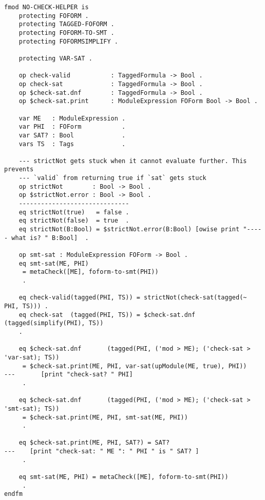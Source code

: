 \documentclass[]{article}
\begin{document}
\begin{verbatim}
fmod NO-CHECK-HELPER is
    protecting FOFORM .
    protecting TAGGED-FOFORM .
    protecting FOFORM-TO-SMT .
    protecting FOFORMSIMPLIFY .

    protecting VAR-SAT .

    op check-valid           : TaggedFormula -> Bool .
    op check-sat             : TaggedFormula -> Bool .
    op $check-sat.dnf        : TaggedFormula -> Bool .
    op $check-sat.print      : ModuleExpression FOForm Bool -> Bool .

    var ME   : ModuleExpression .
    var PHI  : FOForm           .
    var SAT? : Bool             .
    vars TS  : Tags             .

    --- strictNot gets stuck when it cannot evaluate further. This prevents
    --- `valid` from returning true if `sat` gets stuck
    op strictNot        : Bool -> Bool .
    op $strictNot.error : Bool -> Bool .
    ------------------------------
    eq strictNot(true)   = false .
    eq strictNot(false)  = true  .
    eq strictNot(B:Bool) = $strictNot.error(B:Bool) [owise print "----- what is? " B:Bool]  .

    op smt-sat : ModuleExpression FOForm -> Bool .
    eq smt-sat(ME, PHI)
     = metaCheck([ME], foform-to-smt(PHI))
     .

    eq check-valid(tagged(PHI, TS)) = strictNot(check-sat(tagged(~ PHI, TS))) .
    eq check-sat  (tagged(PHI, TS)) = $check-sat.dnf       (tagged(simplify(PHI), TS))
    .

    eq $check-sat.dnf       (tagged(PHI, ('mod > ME); ('check-sat > 'var-sat); TS))
     = $check-sat.print(ME, PHI, var-sat(upModule(ME, true), PHI))
---       [print "check-sat? " PHI]
     .

    eq $check-sat.dnf       (tagged(PHI, ('mod > ME); ('check-sat > 'smt-sat); TS))
     = $check-sat.print(ME, PHI, smt-sat(ME, PHI))
     .

    eq $check-sat.print(ME, PHI, SAT?) = SAT?
---    [print "check-sat: " ME ": " PHI " is " SAT? ]
     .

    eq smt-sat(ME, PHI) = metaCheck([ME], foform-to-smt(PHI))
     .
endfm
\end{verbatim}
\end{document}
